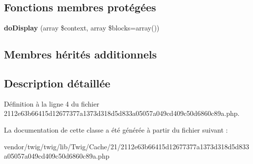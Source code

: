 \subsection*{Fonctions membres protégées}
\begin{DoxyCompactItemize}
\item 
{\bfseries do\+Display} (array \$context, array \$blocks=array())\hypertarget{class_____twig_template__873fced1ec140402098106b2ef090ccfa640af20beaa52de8718017034496b27_adb62b7c226e07d30f836ed16158d924f}{}\label{class_____twig_template__873fced1ec140402098106b2ef090ccfa640af20beaa52de8718017034496b27_adb62b7c226e07d30f836ed16158d924f}

\end{DoxyCompactItemize}
\subsection*{Membres hérités additionnels}


\subsection{Description détaillée}


Définition à la ligne 4 du fichier 2112e63b66415d12677377a1373d318d5d833a05057a049cd409c50d6860c89a.\+php.



La documentation de cette classe a été générée à partir du fichier suivant \+:\begin{DoxyCompactItemize}
\item 
vendor/twig/twig/lib/\+Twig/\+Cache/21/2112e63b66415d12677377a1373d318d5d833a05057a049cd409c50d6860c89a.\+php\end{DoxyCompactItemize}
